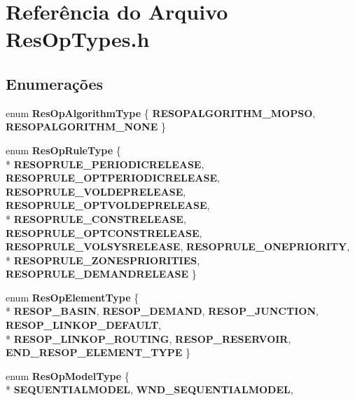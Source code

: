\section{Referência do Arquivo Res\+Op\+Types.\+h}
\label{_2_res_op_types_8h}
\subsection*{Enumerações}
\begin{DoxyCompactItemize}
\item 
enum {\bf Res\+Op\+Algorithm\+Type} \{ {\bf R\+E\+S\+O\+P\+A\+L\+G\+O\+R\+I\+T\+H\+M\+\_\+\+M\+O\+P\+SO}, 
{\bf R\+E\+S\+O\+P\+A\+L\+G\+O\+R\+I\+T\+H\+M\+\_\+\+N\+O\+NE}
 \}
\item 
enum {\bf Res\+Op\+Rule\+Type} \{ \\*
{\bf R\+E\+S\+O\+P\+R\+U\+L\+E\+\_\+\+P\+E\+R\+I\+O\+D\+I\+C\+R\+E\+L\+E\+A\+SE}, 
{\bf R\+E\+S\+O\+P\+R\+U\+L\+E\+\_\+\+O\+P\+T\+P\+E\+R\+I\+O\+D\+I\+C\+R\+E\+L\+E\+A\+SE}, 
{\bf R\+E\+S\+O\+P\+R\+U\+L\+E\+\_\+\+V\+O\+L\+D\+E\+P\+R\+E\+L\+E\+A\+SE}, 
{\bf R\+E\+S\+O\+P\+R\+U\+L\+E\+\_\+\+O\+P\+T\+V\+O\+L\+D\+E\+P\+R\+E\+L\+E\+A\+SE}, 
\\*
{\bf R\+E\+S\+O\+P\+R\+U\+L\+E\+\_\+\+C\+O\+N\+S\+T\+R\+E\+L\+E\+A\+SE}, 
{\bf R\+E\+S\+O\+P\+R\+U\+L\+E\+\_\+\+O\+P\+T\+C\+O\+N\+S\+T\+R\+E\+L\+E\+A\+SE}, 
{\bf R\+E\+S\+O\+P\+R\+U\+L\+E\+\_\+\+V\+O\+L\+S\+Y\+S\+R\+E\+L\+E\+A\+SE}, 
{\bf R\+E\+S\+O\+P\+R\+U\+L\+E\+\_\+\+O\+N\+E\+P\+R\+I\+O\+R\+I\+TY}, 
\\*
{\bf R\+E\+S\+O\+P\+R\+U\+L\+E\+\_\+\+Z\+O\+N\+E\+S\+P\+R\+I\+O\+R\+I\+T\+I\+ES}, 
{\bf R\+E\+S\+O\+P\+R\+U\+L\+E\+\_\+\+D\+E\+M\+A\+N\+D\+R\+E\+L\+E\+A\+SE}
 \}
\item 
enum {\bf Res\+Op\+Element\+Type} \{ \\*
{\bf R\+E\+S\+O\+P\+\_\+\+B\+A\+S\+IN}, 
{\bf R\+E\+S\+O\+P\+\_\+\+D\+E\+M\+A\+ND}, 
{\bf R\+E\+S\+O\+P\+\_\+\+J\+U\+N\+C\+T\+I\+ON}, 
{\bf R\+E\+S\+O\+P\+\_\+\+L\+I\+N\+K\+O\+P\+\_\+\+D\+E\+F\+A\+U\+LT}, 
\\*
{\bf R\+E\+S\+O\+P\+\_\+\+L\+I\+N\+K\+O\+P\+\_\+\+R\+O\+U\+T\+I\+NG}, 
{\bf R\+E\+S\+O\+P\+\_\+\+R\+E\+S\+E\+R\+V\+O\+IR}, 
{\bf E\+N\+D\+\_\+\+R\+E\+S\+O\+P\+\_\+\+E\+L\+E\+M\+E\+N\+T\+\_\+\+T\+Y\+PE}
 \}
\item 
enum {\bf Res\+Op\+Model\+Type} \{ \\*
{\bf S\+E\+Q\+U\+E\+N\+T\+I\+A\+L\+M\+O\+D\+EL}, 
{\bf W\+N\+D\+\_\+\+S\+E\+Q\+U\+E\+N\+T\+I\+A\+L\+M\+O\+D\+EL}, 

\end{DoxyCompactItemize}
